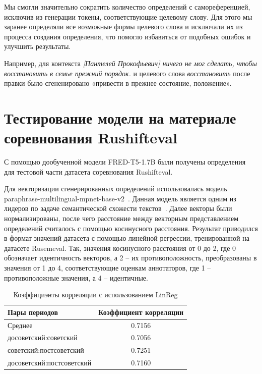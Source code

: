 \documentclass[LI,VKR]{HSEUniversity}
\begin{document}
Мы смогли значительно сократить количество определений с самореференцией,
исключив из генерации токены, соответствующие целевому слову.
Для этого мы заранее определяли все возможные формы целевого слова и
исключали их из процесса создания определения,
что помогло избавиться от подобных ошибок и улучшить результаты.

%
Например, для контекста \textit{[Пантелей Прокофьевич] ничего не мог сделать, чтобы восстановить в семье прежний порядок.}
и целевого слова \textit{восстановить} после правки было сгененировано
«привести в прежнее состояние, положение».

\section{Тестирование модели на материале соревнования Rushifteval}

С помощью дообученной модели FRED-T5-1.7B были получены определения для тестовой части датасета
соревнования Rushifteval.

Для векторизации сгенерированных определений использовалась модель paraphrase-multilingual-mpnet-base-v2~.
Данная модель является одним из лидеров по задаче семантической схожести текстов~.
Далее векторы были нормализированы, после чего расстояние между
векторным представлением определений считалось с помощью косинусного расстояния.
Результат приводился в формат значений датасета с помощью линейной регрессии,
тренированной на датасете Rusemeval.
Так, значения косинусного расстояния от 0 до 2, где 0 обозначает идентичность векторов,
а 2 – их противоположность, преобразованы в значения от 1 до 4,
соответствующие оценкам аннотаторов, где 1 – противоположные значения, а 4 – идентичные.

\begin{table}[H]
\centering
\caption{Коэффициэнты корреляции с использованием LinReg}
\begin{tabular}{|l|c|}
\hline
\textbf{Пары периодов}                  & \textbf{Коэффициент корреляции} \\
\hline
Среднее            & 0.7156                  \\
\hline
досоветский:советский           & 0.7056                  \\
\hline
советский:постсоветский          & 0.7251                  \\
\hline
досоветский:постсоветский      & 0.7160                  \\
\hline
\end{tabular}
\end{table}
\end{document}
